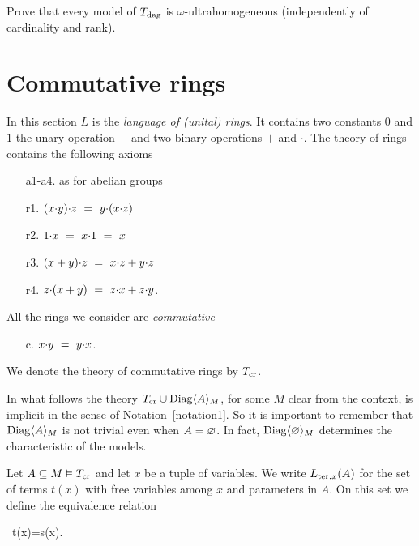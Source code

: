 \begin{exercise}
Prove that every model of $T_{\rm dag}$ is $\omega$-ultrahomogeneous (independently of cardinality and rank).
\end{exercise}

\section{Commutative rings}
\label{anelli}

In this section $L$ is the \emph{language of (unital) rings}.
%
It contains two constants $0$ and $1$ the unary operation $-$ and two binary operations $+$ and $\cdot$.
%
The theory of rings contains the following axioms

\begin{itemize}
\item[a1-a4.] as for abelian groups
\item[r1.] $(x\mdot y)\mdot z\  =\ y\mdot(x\mdot z)$
\item[r2.] $1\mdot x\ =\ x\mdot 1\ =\ x$
\item[r3.] $(x+y)\mdot z\ =\ x\mdot z + y\mdot z$
\item[r4.] $z\mdot (x+y)\ =\ z\mdot x + z\mdot y$.
\end{itemize}

All the rings we consider are \emph{commutative\/} 

\begin{itemize}
\item[c.] $x\mdot y\ =\ y\mdot x$.
\end{itemize}
 
We denote the theory of commutative rings by \emph{$T_{\rm cr}$}.

In what follows the theory $T_{\rm cr}\cup\Diag\<A\>_M$, for some $M$ clear from the context, is implicit in the sense of Notation~\ref{notation1}.
%
So it is important to remember that $\Diag\<A\>_M$ is not trivial even when $A=\0$.
%
In fact, $\Diag\<\0\>_M$ determines the characteristic of the models.

Let  $A\subseteq M\models T_{\rm cr}$ and let $x$ be a tuple of variables.
%
We write $L_{{\rm ter},x}(A)$ for the set of terms $t(x)$ with free variables among $x$ and parameters in $A$.
%
On this set we define the equivalence relation

%
{\IFF}%
{\proves \ t(x)=s(x).}


